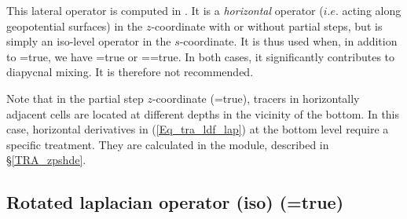 This lateral operator is computed in . It is a \emph{horizontal} 
operator ($i.e.$ acting along geopotential surfaces) in the $z$-coordinate with 
or without partial steps, but is simply an iso-level operator in the $s$-coordinate. 
It is thus used when, in addition to =true, we have 
=true or ==true. 
In both cases, it significantly contributes to diapycnal mixing. 
It is therefore not recommended.

Note that in the partial step $z$-coordinate (=true), tracers in horizontally 
adjacent cells are located at different depths in the vicinity of the bottom. 
In this case, horizontal derivatives in (\ref{Eq_tra_ldf_lap}) at the bottom level 
require a specific treatment. They are calculated in the  module, 
described in \S\ref{TRA_zpshde}.

\subsection   [Rotated laplacian operator (iso) (\np{ln\_traldf\_lap})]
			{Rotated laplacian operator (iso) (=true)}
\label{TRA_ldf_iso}


